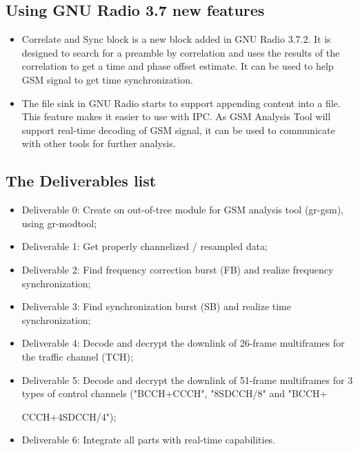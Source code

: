 \documentclass[a4paper,12pt,oneside]{article}
\begin{document}
\subsection{Using GNU Radio 3.7 new features}
\begin{itemize}
\item Correlate and Sync block is a new block added in GNU Radio 3.7.2. It is designed
to search for a preamble by correlation and uses the results of the
correlation to get a time and phase offset estimate.
It can be used to help GSM signal to get time synchronization.

\item The file sink in GNU Radio starts to support appending content into a file. This feature makes it easier to use with IPC.
As GSM Analysis Tool will support real-time decoding of GSM signal, it can be used to communicate with other tools for
further analysis.
\end{itemize}

\subsection{The Deliverables list}
\begin{itemize}
\item Deliverable 0: Create on out-of-tree module for GSM analysis tool (gr-gsm), using gr-modtool;
\item Deliverable 1: Get properly channelized / resampled data;
\item Deliverable 2: Find frequency correction burst (FB) and realize frequency synchronization;
\item Deliverable 3: Find synchronization burst (SB) and realize time synchronization;
\item Deliverable 4: Decode and decrypt the downlink of 26-frame multiframes for the traffic channel (TCH);
\item Deliverable 5: Decode and decrypt the downlink of 51-frame multiframes for 3 types of control channels ("BCCH+CCCH", "8SDCCH/8" and "BCCH+

    CCCH+4SDCCH/4");
\item Deliverable 6: Integrate all parts with real-time capabilities.
\end{itemize}
\end{document}
